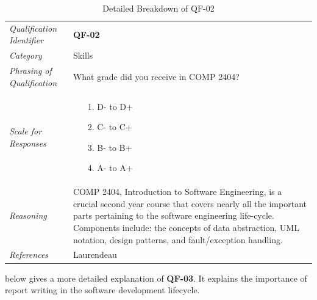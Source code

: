 \documentclass[12pt,letterpaper]{article}
\begin{document}
\begin{table}[H]
	\caption{Detailed Breakdown of QF-02}
	\begin{tabu} to 
		\toprule
		Qualification Identifier & {\bf QF-02}\\
		Category & Skills \\
		Phrasing of Qualification & What grade did you receive in COMP 2404? \\
		Scale for Responses &
		\begin{minipage}[t]{\linewidth}
			\begin{enumerate}
				\item[1.] D- to D+
				\item[2.] C- to C+
				\item[3.] B- to B+
				\item[4.] A- to A+
			\end{enumerate}
		\end{minipage}\\
		Reasoning & COMP 2404, Introduction to Software Engineering, is a crucial second year course that covers nearly all the important parts pertaining to the software engineering life-cycle. Components include: the concepts of data abstraction, UML notation, design patterns, and fault/exception handling.\\
		References & Laurendeau\cite{claurend2}\\
		\toprule
	\end{tabu}
\end{table}

\newpage{}

 below gives a more detailed explanation of {\bf QF-03}. It explains the importance of report writing in the software development lifecycle.
\end{document}
